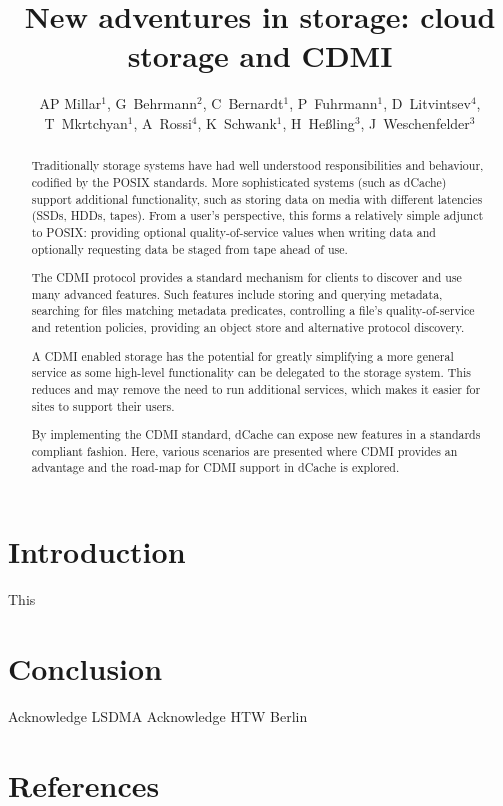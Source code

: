 \documentclass[a4paper]{jpconf}
\begin{document}
\title{New adventures in storage: cloud storage and CDMI}

\author{AP Millar$^1$, G~Behrmann$^2$, C~Bernardt$^1$, P~Fuhrmann$^1$,
  D~Litvintsev$^4$, T~Mkrtchyan$^1$, A~Rossi$^4$, K~Schwank$^1$,
  H~Heßling$^3$, J~Weschenfelder$^3$}

\address{$^1$ IT Dept., DESY, Notkestrasse 85, Hamburg, Germany}
\address{$^2$ NORDUnet, Copenhagen, Denmark}
\address{$^3$ HTW Berlin}
\address{$^4$ Fermilab, Chicago, IL, USA}


\begin{abstract}
Traditionally storage systems have had well understood
responsibilities and behaviour, codified by the POSIX standards. More
sophisticated systems (such as dCache) support additional
functionality, such as storing data on media with different latencies
(SSDs, HDDs, tapes). From a user's perspective, this forms a
relatively simple adjunct to POSIX: providing optional
quality-of-service values when writing data and optionally requesting
data be staged from tape ahead of use.

The CDMI protocol provides a standard mechanism for clients to
discover and use many advanced features. Such features include storing
and querying metadata, searching for files matching metadata
predicates, controlling a file's quality-of-service and retention
policies, providing an object store and alternative protocol
discovery.

A CDMI enabled storage has the potential for greatly simplifying a
more general service as some high-level functionality can be delegated
to the storage system. This reduces and may remove the need to run
additional services, which makes it easier for sites to support their
users.

By implementing the CDMI standard, dCache can expose new features in a
standards compliant fashion. Here, various scenarios are presented
where CDMI provides an advantage and the road-map for CDMI support in
dCache is explored.
\end{abstract}

\section{Introduction}

This\cite{rfc3230}

\section{Conclusion}

\ack

Acknowledge LSDMA
Acknowledge HTW Berlin

\section*{References}

\end{document}
